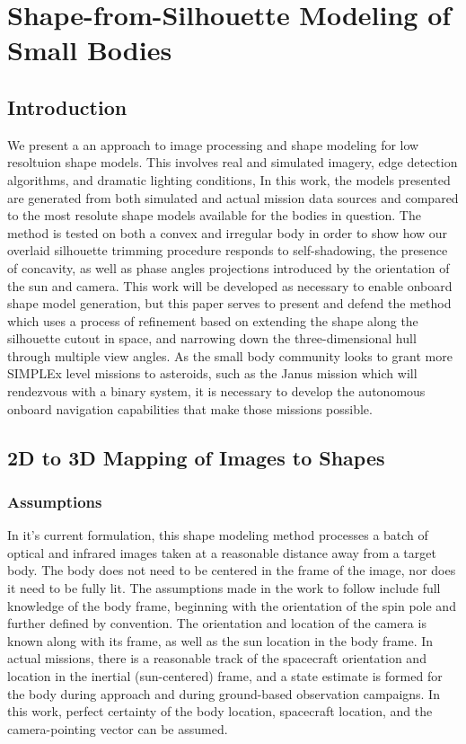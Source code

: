 \chapter{Shape-from-Silhouette Modeling of Small Bodies}
\label{shape_modeling}
\section{Introduction}
We present a an approach to image processing and shape modeling for low resoltuion shape models. This involves real and simulated imagery, edge detection algorithms, and dramatic lighting conditions, 
In this work, the models presented are generated from both simulated and actual mission data sources and compared to the most resolute shape models available for the bodies in question. The method is tested on both a convex and irregular body in order to show how our overlaid silhouette trimming procedure responds to self-shadowing, the presence of concavity, as well as phase angles  projections introduced by the orientation of the sun and camera. This work will be developed as necessary to enable onboard shape model generation, but this paper serves to present and defend the method which uses a process of refinement based on extending the shape along the silhouette cutout in space, and narrowing down the three-dimensional hull through multiple view angles. As the small body community looks to grant more SIMPLEx level missions to asteroids, such as the Janus mission which will rendezvous with a binary system, it is necessary to develop the autonomous onboard navigation capabilities that make those missions possible. 

\section{2D to 3D Mapping of Images to Shapes}
\subsection{Assumptions} 
In it's current formulation, this shape modeling method processes a batch of optical and infrared images taken at a reasonable distance away from a target body. The body does not need to be centered in the frame of the image, nor does it need to be fully lit. The assumptions made in the work to follow include full knowledge of the body frame, beginning with the orientation of the spin pole and further defined by convention. The orientation and location of the camera is known along with its frame, as well as the sun location in the body frame. In actual missions, there is a reasonable track of the spacecraft orientation and location in the inertial (sun-centered) frame, and a state estimate is formed for the body during approach and during ground-based observation campaigns. In this work, perfect certainty of the body location, spacecraft location, and the camera-pointing vector can be assumed.    

